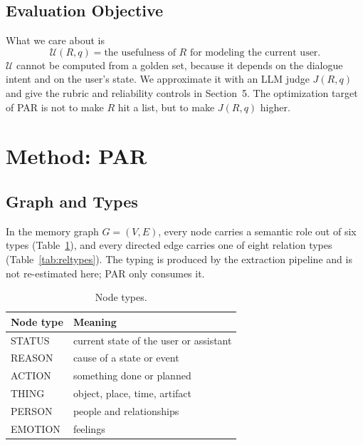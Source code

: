 \documentclass[11pt]{article}
\begin{document}
\subsection{Evaluation Objective}

What we care about is
\begin{equation}
  \mathcal{U}(R,q)=\text{the usefulness of }R\text{ for modeling the current user}.
\end{equation}
$\mathcal{U}$ cannot be computed from a golden set, because it depends on the dialogue intent
and on the user's state. We approximate it with an LLM judge $J(R,q)$ and give the rubric and
reliability controls in Section~5. The optimization target of PAR is not to make $R$ hit a
list, but to make $J(R,q)$ higher.

\section{Method: PAR}

\subsection{Graph and Types}
\label{sec:graph}

In the memory graph $G=(V,E)$, every node carries a semantic role out of six types
(Table~\ref{tab:nodetypes}), and every directed edge carries one of eight relation types
(Table~\ref{tab:reltypes}). The typing is produced by the extraction pipeline and is not
re-estimated here; PAR only consumes it.

\begin{table}[t]
  \centering
  \small
  \begin{tabular}{@{}ll@{}}
    \toprule
    Node type & Meaning \\
    \midrule
    STATUS  & current state of the user or assistant \\
    REASON  & cause of a state or event \\
    ACTION  & something done or planned \\
    THING   & object, place, time, artifact \\
    PERSON  & people and relationships \\
    EMOTION & feelings \\
    \bottomrule
  \end{tabular}
  \caption{Node types.}\label{tab:nodetypes}
\end{table}
\end{document}

